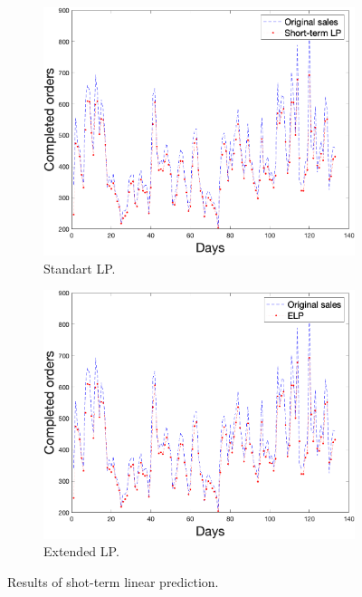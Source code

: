     \begin{figure}
        \centering
        \begin{subfigure}[b]{0.4\textwidth}
            \includegraphics[width=\textwidth]{figures/expLP.png}
            \caption{Standart LP.}
            \label{fig:slpres}
        \end{subfigure}
        \hspace{0.1\textwidth}
        \begin{subfigure}[b]{0.4\textwidth}
            \includegraphics[width=\textwidth]{figures/expELP.png}
            \caption{Extended LP.}
            \label{fig:slpmse}
        \end{subfigure}
        \caption{Results of shot-term linear prediction.}
        \label{fig:shortresult}
    \end{figure}
    
